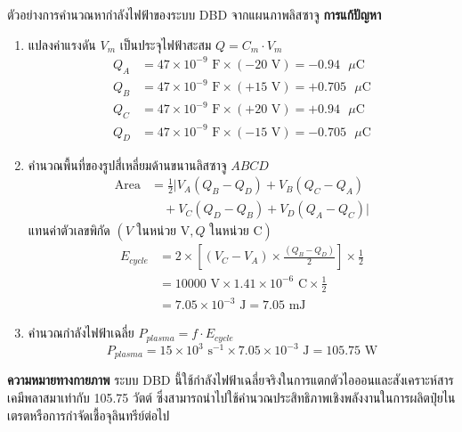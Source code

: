 \begin{examplebox}{ตัวอย่างการคำนวณหากำลังไฟฟ้าของระบบ DBD จากแผนภาพลิสซาจู}
\textbf{การแก้ปัญหา}
\begin{enumerate}
    \item แปลงค่าแรงดัน $V_m$ เป็นประจุไฟฟ้าสะสม $Q = C_m \cdot V_m$
    \begin{align*}
        Q_A &= 47 \times 10^{-9}\text{ F} \times (-20\text{ V}) = -0.94\text{ }\mu\text{C} \\
        Q_B &= 47 \times 10^{-9}\text{ F} \times (+15\text{ V}) = +0.705\text{ }\mu\text{C} \\
        Q_C &= 47 \times 10^{-9}\text{ F} \times (+20\text{ V}) = +0.94\text{ }\mu\text{C} \\
        Q_D &= 47 \times 10^{-9}\text{ F} \times (-15\text{ V}) = -0.705\text{ }\mu\text{C}
    \end{align*}
    \item คำนวณพื้นที่ของรูปสี่เหลี่ยมด้านขนานลิสซาจู $ABCD$
    \begin{equation*}
    \begin{aligned}
        \text{Area} &= \frac{1}{2} \big| V_A(Q_B - Q_D) + V_B(Q_C - Q_A) \\
        &\quad + V_C(Q_D - Q_B) + V_D(Q_A - Q_C) \big|
    \end{aligned}
    \end{equation*}
    แทนค่าตัวเลขพิกัด $(V \text{ ในหน่วย V}, Q \text{ ในหน่วย C})$
    \begin{equation*}
    \begin{aligned}
        E_{cycle} &= 2 \times \left[ (V_C - V_A) \times \frac{(Q_B - Q_D)}{2} \right] \times \frac{1}{2} \\
        &= 10000\text{ V} \times 1.41 \times 10^{-6}\text{ C} \times \frac{1}{2} \\
        &= 7.05 \times 10^{-3}\text{ J} = 7.05\text{ mJ}
    \end{aligned}
    \end{equation*}
    \item คำนวณกำลังไฟฟ้าเฉลี่ย $P_{plasma} = f \cdot E_{cycle}$
    \begin{equation*}
        P_{plasma} = 15 \times 10^3\text{ s}^{-1} \times 7.05 \times 10^{-3}\text{ J} = 105.75\text{ W}
    \end{equation*}
\end{enumerate}
\textbf{ความหมายทางกายภาพ} ระบบ DBD นี้ใช้กำลังไฟฟ้าเฉลี่ยจริงในการแตกตัวไอออนและสังเคราะห์สารเคมีพลาสมาเท่ากับ 105.75 วัตต์ ซึ่งสามารถนำไปใช้คำนวณประสิทธิภาพเชิงพลังงานในการผลิตปุ๋ยไนเตรตหรือการกำจัดเชื้อจุลินทรีย์ต่อไป
\end{examplebox}


